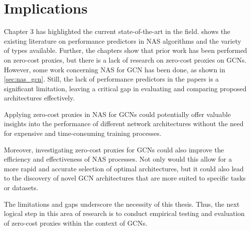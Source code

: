\section{Implications}

Chapter 3 has highlighted the current state-of-the-art in the field.  shows the existing literature on performance predictors in \gls{NAS} algorithms and the variety of types available. Further, the chapters show that prior work has been performed on zero-cost proxies, but there is a lack of research on zero-cost proxies on \glspl{GCN}. However, some work concerning \gls{NAS} for \gls{GCN} has been done, as shown in \cref{sec:nas_gcn}. Still, the lack of performance predictors in the papers is a significant limitation, leaving a critical gap in evaluating and comparing proposed architectures effectively. 

Applying zero-cost proxies in \gls{NAS} for \glspl{GCN} could potentially offer valuable insights into the performance of different network architectures without the need for expensive and time-consuming training processes.

Moreover, investigating zero-cost proxies for \glspl{GCN} could also improve the efficiency and effectiveness of \gls{NAS} processes. Not only would this allow for a more rapid and accurate selection of optimal architectures, but it could also lead to the discovery of novel \gls{GCN} architectures that are more suited to specific tasks or datasets.

The limitations and gaps underscore the necessity of this thesis. Thus, the next logical step in this area of research is to conduct empirical testing and evaluation of zero-cost proxies within the context of \glspl{GCN}.
